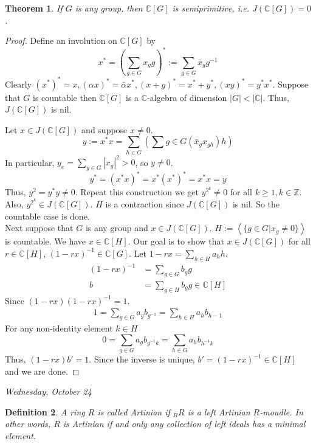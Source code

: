 \documentclass[letterpaper, leqno, 12pt]{article}
\newcommand{\bZ}{\mathbb{Z}}
\providecommand{\ip}[1]{\left\langle #1 \right\rangle}
\newcommand{\bC} {\mathbb{C}}
\theoremstyle{stdthm}
\newtheorem{thm}{Theorem}
\theoremstyle{stddef}
\newtheorem{defn}[thm]{Definition}
\theoremstyle{stdnonum}
\theoremstyle{stdqands}
\theoremstyle{stdbold}
\begin{document}
\begin{thm}
If $G$ is any group, then $\bC[G]$ is semiprimitive, i.e. $J(\bC[G]) = 0$. 
\end{thm}

\begin{proof}
Define an involution on $\bC[G]$ by 
\[ x^* = \left( \sum_{g \in G} x_g g \right)^* := \sum_{g \in G} \bar{x}_g g^{-1} \]
Clearly $(x^*)^* = x, (\alpha x)^* = \bar{\alpha} x^*, (x+g)^* = x^* + y^*, (xy)^* = y^*x^*$. Suppose that $G$ is countable then $\bC[G]$ is a $\bC$-algebra of dimension $|G|<|\bC|$. Thus, $J(\bC[G])$ is nil. 

Let $x \in J(\bC[G])$ and suppose $x \neq 0$. 
\[ y:= x^*x = \sum_{h \in G} \left( \sum {g \in G} (\bar{x}_g x_{gh})h \right) \]
In particular, $y_e = \sum_{y \in G} |x_g|^2 > 0$, so $y \neq 0$. 
\[ y^* = (x^* x)^* = x^*(x^*)^* = x^* x = y \]
Thus, $y^2 = y^*y \neq 0$. Repeat this construction we get $y^{2^k} \neq 0$ for all $k\geq 1, k \in \bZ$. Also, $y^{2^k} \in J(\bC[G])$. $H$ is a contraction since $J(\bC[G])$ is nil. So the countable case is done.\\

\noindent Next suppose that $G$ is any group and $x \in J(\bC[G])$.  $H:= \ip{\{g \in G| x_g \neq 0\}}$ is countable. We have $x \in \bC[H]$. Our goal is to show that $x \in J(\bC[G])$ for all $r \in \bC[H]$, $(1- rx)^{-1} \in \bC[G]$. Let $1- rx = \sum_{h \in H} a_{h}h$.
\begin{align*}
(1-rx)^{-1} &= \sum_{g \in G} b_g g\\
b &= \sum_{g \in H} b_g g \in \bC[H]
\end{align*}
Since $(1-rx)(1-rx)^{-1} = 1$. 
\begin{align*}
1 = \sum_{g \in G} a_g b_{g^{-1}} = \sum_{h \in H} a_h b_{h-1}
\end{align*}
For any non-identity element $k \in H$ 
\[ 0 = \sum_{g \in G} a_g b_{g^{-1} k} = \sum_{h \in G} a_h b_{h^{-1}k}\]
Thus, $(1-rx)b' = 1$. Since the inverse is unique, $b' = (1-rx)^{-1} \in \bC[H]$ and we are done. 
\end{proof}
\begin{center}
\emph{Wednesday, October 24}
\end{center}

\begin{defn}
 A ring $R$ is called Artinian if $_RR$ is a left Artinian $R$-moudle. In other words, $R$ is Artinian if and only any collection of left ideals has a minimal element. 
\end{defn}
\end{document}
